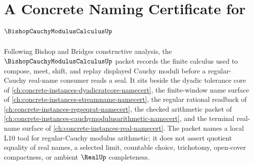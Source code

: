 \chapter{A Concrete Naming Certificate for $\BishopCauchyModulusCalculusUp$}
\label{ch:concrete-instances-bishop-cauchy-modulus-calculus-namecert}

Following Bishop and Bridges constructive analysis, the $\BishopCauchyModulusCalculusUp$ packet records the finite calculus used to compose, meet, shift, and replay displayed Cauchy moduli before a regular-Cauchy real-name consumer reads a seal. It sits beside the dyadic tolerance core of \autoref{ch:concrete-instances-dyadicratcore-namecert}, the finite-window name surface of \autoref{ch:concrete-instances-streamname-namecert}, the regular rational readback of \autoref{ch:concrete-instances-regseqrat-namecert}, the checked arithmetic packet of \autoref{ch:concrete-instances-cauchymodulusarithmetic-namecert}, and the terminal real-name surface of \autoref{ch:concrete-instances-real-namecert}. The packet names a local L10 tool for regular-Cauchy modulus arithmetic; it does not assert quotient equality of real names, a selected limit, countable choice, trichotomy, open-cover compactness, or ambient $\RealUp$ completeness.

